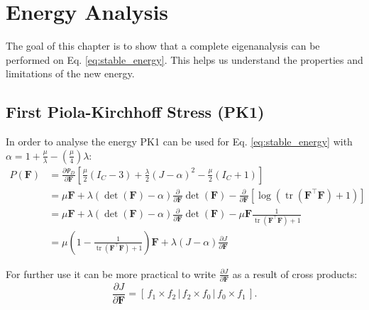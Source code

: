 \section{Energy Analysis}
The goal of this chapter is to show that a complete eigenanalysis can be performed on Eq. \ref{eq:stable_energy}. This helps us understand the properties and limitations of the new energy.


\subsection{First Piola-Kirchhoff Stress (PK1)}
In order to analyse the energy PK1 can be used for Eq. \ref{eq:stable_energy} with $\alpha=1+\frac{\mu}{\lambda}-\left(\frac{\mu}{4}\right)\lambda$:
\begin{align*}
P(\mathbf{F}) &= \frac{\partial \Psi_{D}}{\partial \mathbf{F}} \left[ \frac{\mu}{2}\left(I_{C}-3\right) + \frac{\lambda}{2}(J-\alpha)^{2} - \frac{\mu}{2}\left(I_{C}+1\right) \right] \\
&= \mu \mathbf{F} + \lambda (\operatorname{det}(\mathbf{F})-\alpha)  \frac{\partial}{\partial \mathbf{F}} \operatorname{det}(\mathbf{F}) - \frac{\partial}{\partial \mathbf{F}} \left[\operatorname{log}\left(\operatorname{tr}(\mathbf{F}^\intercal \mathbf{F})+1\right)\right] \\
&= \mu \mathbf{F} + \lambda (\operatorname{det}(\mathbf{F})-\alpha)  \frac{\partial}{\partial \mathbf{F}} \operatorname{det}(\mathbf{F}) - \mu \mathbf{F} \frac{1}{\operatorname{tr}(\mathbf{F}^\intercal \mathbf{F}) + 1} \\
&= \mu \left( 1 - \frac{1}{\operatorname{tr}(\mathbf{F}^\intercal \mathbf{F}) + 1}\right) \mathbf{F} + \lambda(J-\alpha)\frac{\partial J}{\partial \mathbf{F}}
\end{align*}

For further use it can be more practical to write $\frac{\partial J}{\partial \mathbf{F}}$ as a result of cross products:
\begin{equation}\label{eq:cross_product}
\frac{\partial J}{\partial \mathbf{F}} = \left[ \,f_1 \times f_2\, \bigg| \,f_2 \times f_0\, \bigg| \,f_0 \times f_1\, \right].
\end{equation}


